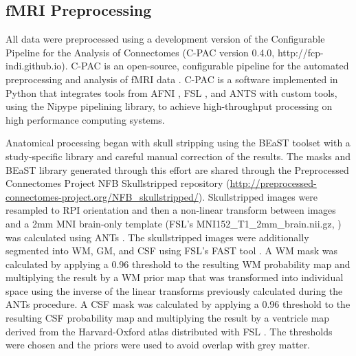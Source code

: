 \subsection{fMRI Preprocessing}

All data were preprocessed using a development version of the Configurable Pipeline for the Analysis of Connectomes (C-PAC version 0.4.0, http://fcp-indi.github.io). C-PAC is an open-source, configurable pipeline for the automated preprocessing and analysis of fMRI data \cite{Cameron2013}. C-PAC is a software implemented in Python that integrates tools from AFNI \cite{Cox1996}, FSL \cite{Smith2004}, and ANTS \cite{Avants2008} with custom tools, using the Nipype \cite{Gorgolewski2011} pipelining library, to achieve high-throughput processing on high performance computing systems.

Anatomical processing began with skull stripping using the BEaST toolset \cite{Eskildsen2012} with a study-specific library and careful manual correction of the results. The masks and BEaST library generated through this effort are shared through the Preprocessed Connectomes Project NFB Skullstripped repository (\href{http://preprocessed-connectomes-project.org/NFB_skullstripped/}{http://preprocessed-connectomes-project.org/NFB\_skullstripped/})\cite{Puccio2016}. Skullstripped images were resampled to RPI orientation and then a non-linear transform between images and a 2mm MNI brain-only template (FSL's MNI152\_T1\_2mm_brain.nii.gz, \cite{Smith_2004}) was calculated using ANTs \cite{Avants_2008}. The skullstripped images were additionally segmented into WM, GM, and CSF using FSL's FAST tool \cite{Zhang_2001}. A WM mask was calculated by applying a 0.96 threshold to the resulting WM probability map and multiplying the result by a WM prior map that was transformed into individual space using the inverse of the linear transforms previously calculated during the ANTs procedure. A CSF mask was calculated by applying a 0.96 threshold to the resulting CSF probability map and multiplying the result by a ventricle map derived from the Harvard-Oxford atlas distributed with FSL \cite{Makris_2006}. The thresholds were chosen and the priors were used to avoid overlap with grey matter.

